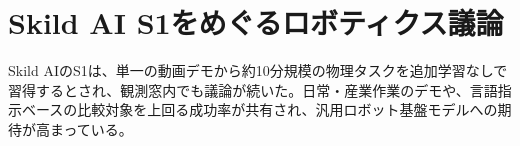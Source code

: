 \section{Skild AI S1をめぐるロボティクス議論}
Skild AIのS1は、単一の動画デモから約10分規模の物理タスクを追加学習なしで習得するとされ、観測窓内でも議論が続いた。日常・産業作業のデモや、言語指示ベースの比較対象を上回る成功率が共有され、汎用ロボット基盤モデルへの期待が高まっている。
